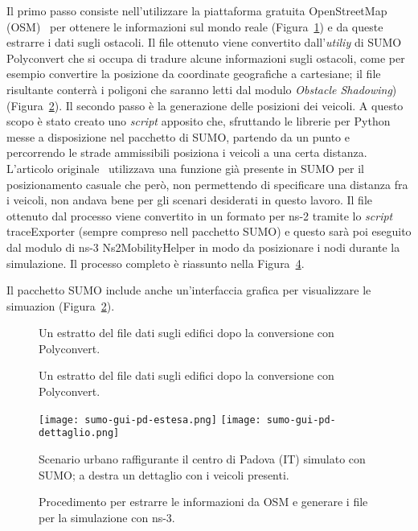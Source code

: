 Il primo passo consiste nell'utilizzare la piattaforma gratuita OpenStreetMap (OSM)~\cite{osmWebsite} per
ottenere le informazioni sul mondo reale (Figura~\ref{fig:esempio-file-osm}) e da queste estrarre i dati sugli ostacoli.
Il file ottenuto viene convertito dall'\textit{utiliy} di SUMO Polyconvert che si occupa di tradure alcune informazioni
sugli ostacoli, come per esempio convertire la posizione da coordinate geografiche a cartesiane;
il file risultante conterrà i poligoni che saranno letti dal modulo \textit{Obstacle Shadowing}) (Figura~\ref{fig:esempio-file-poly}).
Il secondo passo è la generazione delle posizioni dei veicoli.
A questo scopo è stato creato uno \textit{script} apposito che, sfruttando le librerie per Python messe a disposizione
nel pacchetto di SUMO, partendo da un punto e percorrendo le strade ammissibili posiziona i veicoli a una certa distanza.
L'articolo originale~\cite{Carpenter:2015:OMI:2756509.2756512} utilizzava una funzione già presente in SUMO
per il posizionamento casuale che però, non permettendo di specificare una distanza fra i veicoli, non andava bene per gli scenari desiderati in questo lavoro.
%
Il file ottenuto dal processo viene convertito in un formato per ns-2 tramite lo \textit{script} traceExporter (sempre compreso nell pacchetto SUMO)
e questo sarà poi eseguito dal modulo di ns-3 \textsf{Ns2MobilityHelper} in modo da posizionare i nodi durante la simulazione.
Il processo completo è riassunto nella Figura~\ref{fig:generazione-file-sumo}.

Il pacchetto SUMO include anche un'interfaccia grafica per visualizzare le simuazion (Figura~\ref{fig:esempio-file-poly}).
%
\begin{figure}[htbp]
	\centering
\caption{Un estratto del file dati sugli edifici dopo la conversione con Polyconvert.\label{fig:esempio-file-osm}}
\end{figure}
%
%
\begin{figure}[htbp]
	\centering
\caption{Un estratto del file dati sugli edifici dopo la conversione con Polyconvert.\label{fig:esempio-file-poly}}
\end{figure}
%
\begin{figure}[htbp]
	\centering
		\texttt{[image: sumo-gui-pd-estesa.png]}
		\hfill
		\texttt{[image: sumo-gui-pd-dettaglio.png]}
\caption{Scenario urbano raffigurante il centro di Padova (IT) simulato con SUMO; a destra un dettaglio con i veicoli presenti.\label{fig:sumo-gui}}
\end{figure}
%
\begin{figure}[htbp]
	\centering
	{
		\setlength{\fboxsep}{0pt}	%
	}
\caption{Procedimento per estrarre le informazioni da OSM e generare i file per la simulazione con ns-3.\label{fig:generazione-file-sumo}}
\end{figure}
